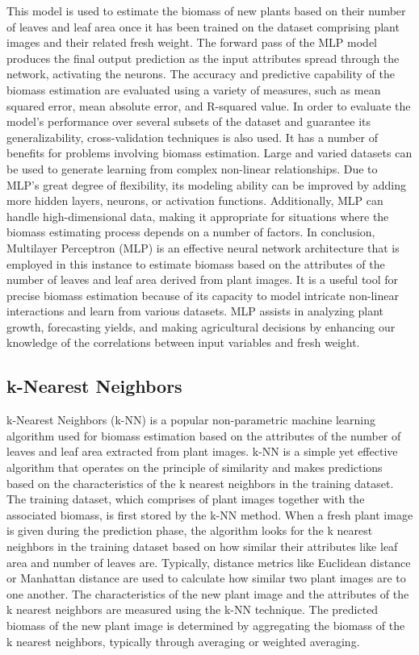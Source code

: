 \documentclass[a4paper,12pt]{report}%
\renewcommand{\\}{\vspace*{0.5\baselineskip} \newline}
\begin{document}
\noindent This model is used to estimate the biomass of new plants based on their number of leaves and leaf area once it has been trained on the dataset comprising plant images and their related fresh weight. The forward pass of the MLP model produces the final output prediction as the input attributes spread through the network, activating the neurons.
The accuracy and predictive capability of the biomass estimation are evaluated using a variety of measures, such as mean squared error, mean absolute error, and R-squared value. In order to evaluate the model's performance over several subsets of the dataset and guarantee its generalizability, cross-validation techniques is also used.
It has a number of benefits for problems involving biomass estimation. Large and varied datasets can be used to generate learning from complex non-linear relationships. Due to MLP's great degree of flexibility, its modeling ability can be improved by adding more hidden layers, neurons, or activation functions. Additionally, MLP can handle high-dimensional data, making it appropriate for situations where the biomass estimating process depends on a number of factors.
In conclusion, Multilayer Perceptron (MLP) is an effective neural network architecture that is employed in this instance to estimate biomass based on the attributes of the number of leaves and leaf area derived from plant images. It is a useful tool for precise biomass estimation because of its capacity to model intricate non-linear interactions and learn from various datasets. MLP assists in analyzing plant growth, forecasting yields, and making agricultural decisions by enhancing our knowledge of the correlations between input variables and fresh weight.

\subsection{k-Nearest Neighbors}
k-Nearest Neighbors (k-NN) is a popular non-parametric machine learning algorithm used for biomass estimation based on the attributes of the number of leaves and leaf area extracted from plant images. k-NN is a simple yet effective algorithm that operates on the principle of similarity and makes predictions based on the characteristics of the k nearest neighbors in the training dataset.
The training dataset, which comprises of plant images together with the associated biomass, is first stored by the k-NN method. When a fresh plant image is given during the prediction phase, the algorithm looks for the k nearest neighbors in the training dataset based on how similar their attributes like leaf area and number of leaves are.
Typically, distance metrics like Euclidean distance or Manhattan distance are used to calculate how similar two plant images are to one another. The characteristics of the new plant image and the attributes of the k nearest neighbors are measured using the k-NN technique. The predicted biomass of the new plant image is determined by aggregating the biomass of the k nearest neighbors, typically through averaging or weighted averaging.
\end{document}
